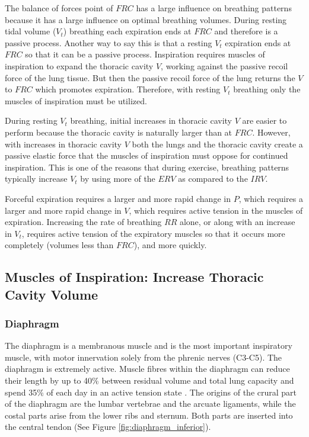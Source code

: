 The balance of forces point of $FRC$ has a large influence on breathing patterns because it has a large influence on optimal breathing volumes. During resting tidal volume ($V_t$) breathing each expiration ends at $FRC$ and therefore is a passive process. Another way to say this is that a resting $V_t$ expiration ends at $FRC$ so that it can be a passive process. Inspiration requires muscles of inspiration to expand the thoracic cavity $V$, working against the passive recoil force of the lung tissue. But then the passive recoil force of the lung returns the $V$ to $FRC$ which promotes expiration. Therefore, with resting $V_t$ breathing only the muscles of inspiration must be utilized. 

During resting $V_t$ breathing, initial increases in thoracic cavity $V$ are easier to perform because the thoracic cavity is naturally larger than at $FRC$. However, with increases in thoracic cavity $V$ both the lungs and the thoracic cavity create a passive elastic force that the muscles of inspiration must oppose for continued inspiration. This is one of the reasons that during exercise, breathing patterns typically increase $V_t$ by using more of the $ERV$ as compared to the $IRV$.

Forceful expiration requires a larger and more rapid change in $P$, which requires a larger and more rapid change in $V$, which requires active tension in the muscles of expiration. Increasing the rate of breathing $RR$ alone, or along with an increase in $V_t$, requires active tension of the expiratory muscles so that it occurs more completely (volumes less than $FRC$), and more quickly. 

\subsection{Muscles of Inspiration: Increase Thoracic Cavity Volume}

\subsubsection{Diaphragm}

The diaphragm is a membranous muscle and is the most important inspiratory muscle, with motor innervation solely from the phrenic nerves (C3-C5). The diaphragm is extremely active. Muscle fibres within the diaphragm can reduce their length by up to 40\% between residual volume and total lung capacity and spend 35\% of each day in an active tension state \cite{lumb_nunns_2020}. The origins of the crural part of the diaphragm are the lumbar vertebrae and the arcuate ligaments, while the costal parts arise from the lower ribs and sternum. Both parts are inserted into the central tendon (See Figure \ref{fig:diaphragm_inferior}). 

